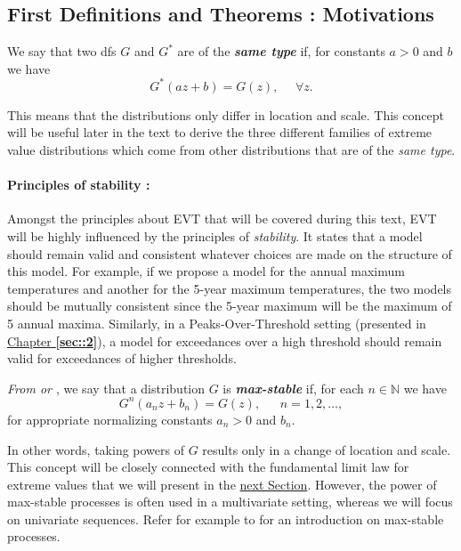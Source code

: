 

\subsection*{First Definitions and Theorems : Motivations}
\theoremstyle{definition}
\begin{definition}\label{similardf} We say that two dfs $G$ and $G^*$ are of the \emph{\textbf{same type}} if, for constants $a>0$ and $b$ we have
	\begin{equation}\label{simm}
	G^*(az+b)=G(z), \ \ \ \ \ \ \forall z.
	\end{equation}
\end{definition}
This means that the distributions only differ in location and scale. 
This concept will be useful later in the text to derive the three different families of extreme value distributions which come from other distributions that are of the \emph{same type}.


\paragraph*{Principles of stability :}
Amongst the principles about EVT that will be covered during this text, EVT will be highly influenced by the principles of \emph{stability}. It states that a model should remain valid and consistent whatever choices are made on the structure of this model.
For example, if we propose a model for the annual maximum temperatures and another for the 5-year maximum temperatures, the two models should be mutually consistent since the 5-year maximum will be the maximum of 5 annual maxima. Similarly, in a Peaks-Over-Threshold setting (presented in \hyperref[sec::2]{Chapter \textbf{\ref{sec::2}}}), a model for exceedances over a high threshold should remain valid for exceedances of higher thresholds. 



\begin{definition} \label{maxstab}
	\emph{From \cite{leadbetter_extremes_1983} or \cite{resnick_extreme_1987}}, we say that a distribution $G$ is \emph{\textbf{max-stable}} if, for each $n\in\mathbb{N}$ we have	
	\begin{equation}
	G^n(a_nz+b_n)=G(z), \ \ \ \ \ \ \ n= 1,2,\dots ,
	\end{equation}
	for appropriate normalizing constants $a_n>0$ and $b_n$.
\end{definition}
In other words, taking powers of $G$ results only in a change of location and scale. This concept will be closely connected with the fundamental limit law for extreme values that we will present in the \hyperref[sec:extrtypethm]{next Section}.
However, the power of max-stable processes is often used in a multivariate setting, whereas we will focus on univariate sequences. Refer for example to \citet{ribatet_spatial_2015} for an introduction on max-stable processes.


